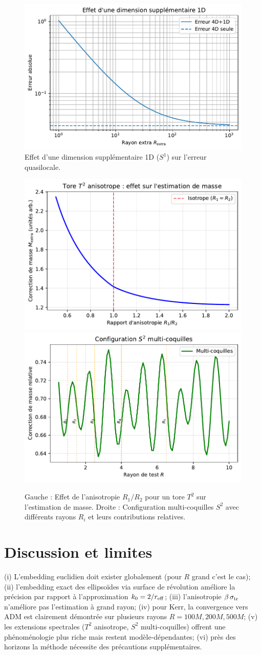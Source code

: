 \documentclass[11pt]{article}
\begin{document}
\begin{figure}[!htb]
\centering
\includegraphics[width=.75\linewidth]{fig_extra_dimension_effect_improved.pdf}
\caption{Effet d'une dimension suppl\'ementaire 1D (\(S^1\)) sur l'erreur quasilocale.}
\end{figure}

\begin{figure}[!htb]
\centering
\includegraphics[width=.48\linewidth]{fig_torus_anisotropic.pdf}
\includegraphics[width=.48\linewidth]{fig_sphere_multishell.pdf}
\caption{Gauche : Effet de l'anisotropie $R_1/R_2$ pour un tore $T^2$ sur l'estimation de masse. Droite : Configuration multi-coquilles $S^2$ avec diff\'erents rayons $R_i$ et leurs contributions relatives.}
\end{figure}
\clearpage

\section{Discussion et limites}
(i) L'embedding euclidien doit exister globalement (pour $R$ grand c'est le cas); 
(ii) l'embedding exact des ellipso\"ides via surface de r\'evolution am\'eliore la pr\'ecision par rapport \`a l'approximation $k_0=2/r_{\rm eff}$; 
(iii) l'anisotropie $\beta\,\sigma_{\rm tr}$ n'am\'eliore pas l'estimation \`a grand rayon; 
(iv) pour Kerr, la convergence vers ADM est clairement d\'emontr\'ee sur plusieurs rayons $R = 100M, 200M, 500M$; 
(v) les extensions spectrales ($T^2$ anisotrope, $S^2$ multi-coquilles) offrent une ph\'enom\'enologie plus riche mais restent mod\`ele-d\'ependantes; 
(vi) pr\`es des horizons la m\'ethode n\'ecessite des pr\'ecautions suppl\'ementaires.
\end{document}
